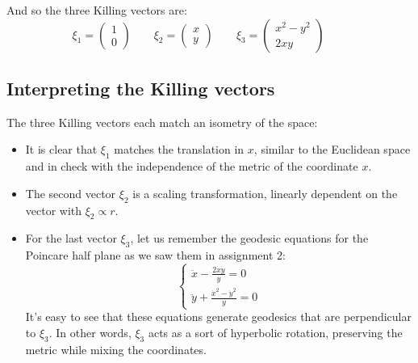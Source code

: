 \documentclass{article}
\begin{document}
And so the three Killing vectors are:
\begin{equation}
    \xi_1 = \begin{pmatrix} 1 \\ 0 \end{pmatrix} \qquad
    \xi_2 = \begin{pmatrix} x \\ y \end{pmatrix} \qquad
    \xi_3 = \begin{pmatrix} x^2 - y^2 \\ 2xy \end{pmatrix} \qquad
\end{equation}
\subsection{Interpreting the Killing vectors}
The three Killing vectors each match an isometry of the space:
\begin{itemize}
    \item It is clear that $\xi_1$ matches the translation in $x$, similar to the Euclidean space and in check with the independence of the metric of the coordinate $x$.
    \item The second vector $\xi_2$ is a scaling transformation, linearly dependent on the vector with $\xi_2 \propto r$.
    \item For the last vector $\xi_3$, let us remember the geodesic equations for the Poincare half plane as we saw them in assignment 2:
    \begin{equation}
        \begin{cases}
            \ddot{x} - \frac{2\dot{x}\dot{y}}{y} = 0
            \\
            \ddot{y} + \frac{\dot{x}^2 - \dot{y}^2}{y} = 0
        \end{cases}
    \end{equation}
    It's easy to see that these equations generate geodesics that are perpendicular to $\xi_3$. In other words, $\xi_3$ acts as a sort of hyperbolic rotation, preserving the metric while mixing the coordinates. 
\end{itemize}
\end{document}
